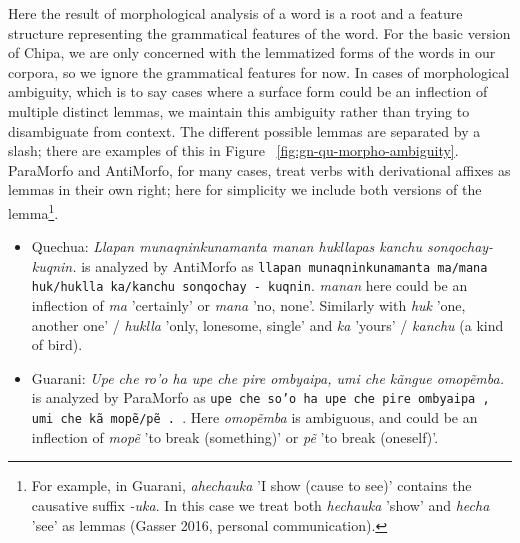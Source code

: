 Here the result of morphological analysis of a word is a root and a feature
structure representing the grammatical features of the word.  For the basic
version of Chipa, we are only concerned with the lemmatized forms of the words
in our corpora, so we ignore the grammatical features for now.  In cases of
morphological ambiguity, which is to say cases where a surface form could be an
inflection of multiple distinct lemmas, we maintain this ambiguity rather than
trying to disambiguate from context.  The different possible lemmas are
separated by a slash; there are examples of this in
Figure ~\ref{fig:gn-qu-morpho-ambiguity}. ParaMorfo and AntiMorfo, for many
cases, treat verbs with derivational affixes as lemmas in their own right; here
for simplicity we include both versions of the lemma\footnote{For example, in
Guarani, \emph{ahechauka} 'I show (cause to see)' contains the causative suffix
\emph{-uka}. In this case we treat both \emph{hechauka} 'show' and \emph{hecha}
'see' as lemmas (Gasser 2016, personal communication).}.

\begin{figure*}
\begin{itemize}
  \item Quechua: \emph{Llapan munaqninkunamanta manan hukllapas kanchu
  sonqochay- kuqnin.} is analyzed by AntiMorfo as \texttt{llapan
  munaqninkunamanta ma/mana huk/huklla ka/kanchu sonqochay - kuqnin}.
  \emph{manan} here could be an inflection of \emph{ma} 'certainly' or
  \emph{mana} 'no, none'. Similarly with \emph{huk} 'one, another one' /
  \emph{huklla} 'only, lonesome, single' and \emph{ka} 'yours' /
  \emph{kanchu} (a kind of bird).
  \item Guarani: \emph{Upe che ro'o ha upe che pire ombyaipa, umi che kãngue
  omopẽmba.} is analyzed by ParaMorfo as \texttt{upe
  che so'o ha upe che pire ombyaipa , umi che kã mopẽ/pẽ . }. Here
  \emph{omopẽmba} is ambiguous, and could be an inflection of \emph{mopẽ} 'to
  break (something)' or \emph{pẽ} 'to break (oneself)'.
\end{itemize}
\caption{Examples of morphological ambiguity in Quechua and Guarani,
having been run through AntiMorfo and ParaMorfo. The Quechua text is the first
sentence of Lamentations 1:2; the Guarani is Lamentations 3:4.}
\label{fig:gn-qu-morpho-ambiguity}
\end{figure*}


